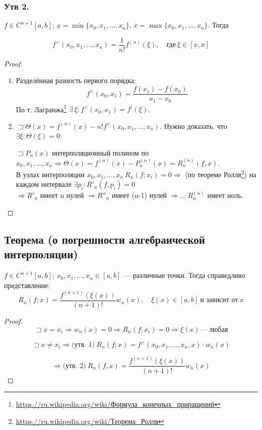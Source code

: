\subsubsection*{Утв 2.}
$f \in C^{n+1}[a, b]$; $\underline{x} = \min\{x_0, x_1, \ldots, x_n\}$, $\overline{x} = \max\{x_0, x_1, \ldots, x_n\}$. Тогда

\[
f^{<}(x_0, x_1, \ldots, x_n) = \frac{1}{n!} f^{(n)}(\xi), \quad \text{где} ~ \xi \in [\underline{x}, \overline{x}]
\]

\begin{proof}
\begin{enumerate}
\item Разделённая разность первого порядка:
\[
f^{<}(x_0, x_1) = \frac{f(x_1) - f(x_0)}{x_1 - x_0}
\]
По т. Лагранжа\footnote{\url{https://ru.wikipedia.org/wiki/Формула_конечных_приращений}} $\exists ~ \xi: f^{<}(x_0, x_1) = f'(\xi)$.

\item $\sqsupset \Theta(x) = f^{(n)}(x) - n! f^{<}(x_0, x_1, \ldots, x_n)$. Нужно доказать, что $\exists \xi : \Theta(\xi) = 0$:

$\sqsupset P_n(x)$ интерполяционный полином по $x_0, x_1, \ldots, x_n \Rightarrow \Theta(x) = f^{(n)}(x) - P^{(n)}_n(x) = R^{(n)}_n(f,x)$. \\
В узлах интерполяции $x_0, x_1, \ldots, x_n ~ R_n(f; x_i) = 0 \Rightarrow$ (по теореме Ролля\footnote{\url{https://ru.wikipedia.org/wiki/Теорема_Ролля}}) на каждом интервале $\exists p_i : R'_n(f, p_i) = 0$ \\
$\Rightarrow R'_n$ имеет n нулей $\Rightarrow R''_n$ имеет (n-1) нулей $\Rightarrow \ldots ~ R^{(n)}_n$ имеет ноль.
\end{enumerate}
\end{proof}

\subsection*{Теорема (о погрешности алгебраической интерполяции)}

$f \in C^{n+1}[a, b]$; $x_0, x_1, \ldots, x_n \in [a, b]$ — различные точки. Тогда справедливо представление:
\[
R_n(f; x) = \frac{f^{(n+1)}(\xi(x))}{(n+1)!} w_n(x), \quad \xi(x) \in [a, b] ~ \text{и зависит от} ~ x
\]

\begin{proof}
\[
\sqsupset x = x_i \Rightarrow w_n(x) = 0 \Rightarrow R_n(f; x_i) = 0 \Rightarrow \xi(x) \text{--- любая}
\]

\[
\sqsupset x \neq x_i \Rightarrow \text{(утв. 1)} ~ R_n(f; x) = f^{<}(x_0, x_1, \ldots, x_n, x) \cdot w_n(x)
\]

\[
\Rightarrow \text{(утв. 2)} ~ R_n(f,x) = \frac{f^{(n+1)}(\xi(x))}{(n+1)!} w_n(x)
\]
\end{proof}

